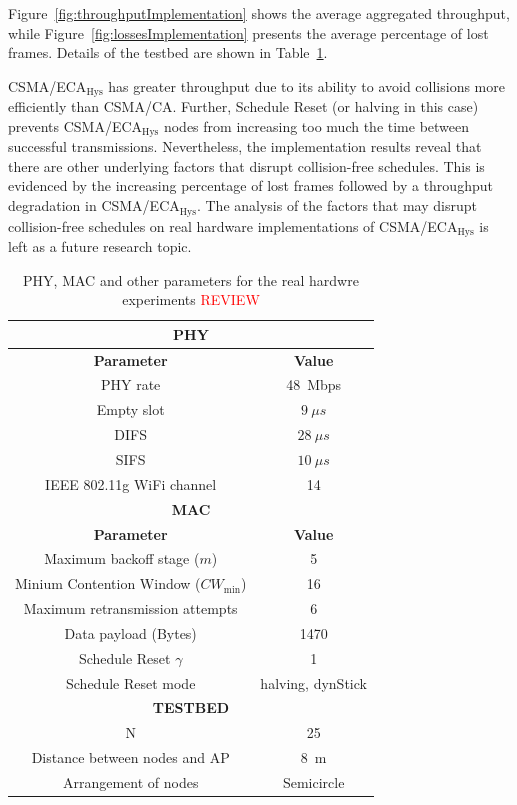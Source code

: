 Figure~\ref{fig:throughputImplementation} shows the average aggregated throughput, while Figure~\ref{fig:lossesImplementation} presents the average percentage of lost frames. Details of the testbed are shown in Table~\ref{tab:testbed}. 

CSMA/ECA$_{\text{Hys}}$ has greater throughput due to its ability to avoid collisions more efficiently than CSMA/CA. Further, Schedule Reset (or halving in this case) prevents CSMA/ECA$_{\text{Hys}}$ nodes from increasing too much the time between successful transmissions. Nevertheless, the implementation results reveal that there are other underlying factors that disrupt collision-free schedules. This is evidenced by the increasing percentage of lost frames followed by a throughput degradation in CSMA/ECA$_{\text{Hys}}$. The analysis of the factors that may disrupt collision-free schedules on real hardware implementations of CSMA/ECA$_{\text{Hys}}$ is left as a future research topic.


	\begin{table}
		\centering
		\caption{PHY, MAC and other parameters for the real hardwre experiments \textcolor{red}{REVIEW}}
		\label{tab:testbed}
		\begin{tabular}{|c|c|}
			\hline
			\multicolumn{2}{|c|}{{\bfseries PHY}}\\
			\hline
			{\bfseries Parameter} & {\bfseries Value}\\
			\hline
			PHY rate & 48~Mbps\\
			Empty slot & $9~\mu s$\\
			DIFS & $28~\mu s$\\
			SIFS & $10~\mu s$\\
			IEEE 802.11g WiFi channel & 14\\
			\hline
			\multicolumn{2}{|c|}{{\bfseries MAC}}\\
			\hline
			{\bfseries Parameter} & {\bfseries Value}\\
			\hline
			Maximum backoff stage ($m$) & 5\\
			Minium Contention Window ($CW_{\min}$) & 16\\
			Maximum retransmission attempts & 6\\
			Data payload (Bytes) & 1470\\
			Schedule Reset $\gamma$ & 1\\
			Schedule Reset mode & halving, dynStick\\
			\hline
			\multicolumn{2}{|c|}{{\bfseries TESTBED}}\\
			\hline
			N & 25\\
			Distance between nodes and AP & 8~m\\
			Arrangement of nodes & Semicircle\\
			\hline
		\end{tabular}
	\end{table}


